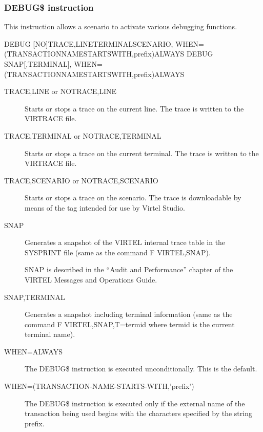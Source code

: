 \documentclass[letterpaper,10pt,english]{sphinxmanual}
\begin{document}
\subsubsection{DEBUG\$ instruction}
\label{\detokenize{User_Guide:debug-instruction}}
This instruction allows a scenario to activate various debugging functions.

\begin{sphinxVerbatim}[commandchars=\\\{\}]
DEBUG\PYGZdl{} [NO]TRACE,LINE\textbar{}TERMINAL\textbar{}SCENARIO,
        WHEN=(TRANSACTION\PYGZhy{}NAME\PYGZhy{}STARTS\PYGZhy{}WITH,\PYGZsq{}prefix\PYGZsq{})\textbar{}ALWAYS
DEBUG\PYGZdl{} SNAP[,TERMINAL],
        WHEN=(TRANSACTION\PYGZhy{}NAME\PYGZhy{}STARTS\PYGZhy{}WITH,\PYGZsq{}prefix\PYGZsq{})\textbar{}ALWAYS
\end{sphinxVerbatim}
\begin{description}
\item[{TRACE,LINE or NOTRACE,LINE}] \leavevmode
Starts or stops a trace on the current line. The trace is written to the VIRTRACE file.

\item[{TRACE,TERMINAL or NOTRACE,TERMINAL}] \leavevmode
Starts or stops a trace on the current terminal. The trace is written to the VIRTRACE file.

\item[{TRACE,SCENARIO or NOTRACE,SCENARIO}] \leavevmode
Starts or stops a trace on the scenario. The trace is downloadable by means of the {\hyperref[\detokenize{User_Guide:v457ug-create-variable-if}]{}} tag intended for use by Virtel Studio.

\item[{SNAP}] \leavevmode
Generates a snapshot of the VIRTEL internal trace table in the SYSPRINT file (same as the command F VIRTEL,SNAP).

SNAP is described in the “Audit and Performance” chapter of the VIRTEL Messages and Operations Guide.

\item[{SNAP,TERMINAL}] \leavevmode
Generates a snapshot including terminal information (same as the command F VIRTEL,SNAP,T=termid where termid is the current terminal name).

\item[{WHEN=ALWAYS}] \leavevmode
The DEBUG\$ instruction is executed unconditionally. This is the default.

\item[{WHEN=(TRANSACTION-NAME-STARTS-WITH,’prefix’)}] \leavevmode
The DEBUG\$ instruction is executed only if the external name of the transaction being used begins with the characters specified by the string prefix.

\end{description}
\end{document}
